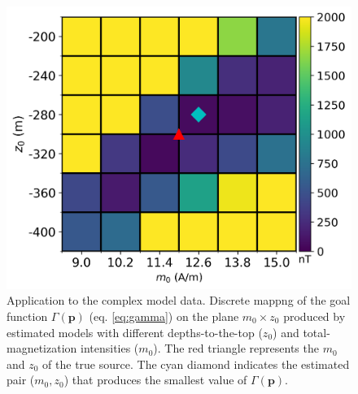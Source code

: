 \begin{figure}
	\centering
	\includegraphics[scale=.75]{figures/complex_gamma.png}
	\caption{Application to the complex model data. 
	Discrete mappng of the goal function $\Gamma(\mathbf{p})$ (eq. \ref{eq:gamma}) on the plane $ m_0 \times z_0 $ produced by estimated models with different depths-to-the-top ($ z_0 $) and 
	total-magnetization intensities ($ m_0 $). 
	The red triangle represents the $m_0$ and $z_0$ of the true source. 
	The cyan diamond indicates the estimated pair ($ m_0, z_0 $) that produces the smallest value of $\Gamma (\mathbf{p})$.}
	\label{fig:complex_map}
\end{figure}

